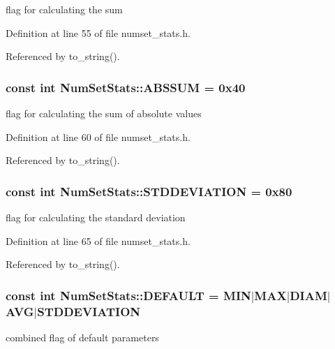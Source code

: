 flag for calculating the sum 

Definition at line 55 of file numset\_\-stats.h.

Referenced by to\_\-string().\hypertarget{class_num_set_stats_afd3e476b938988fc3ed9aef347d83f8}{
\subsubsection[ABSSUM]{\setlength{\rightskip}{0pt plus 5cm}const int {\bf NumSetStats::ABSSUM} = 0x40}}
\label{class_num_set_stats_afd3e476b938988fc3ed9aef347d83f8}


flag for calculating the sum of absolute values 

Definition at line 60 of file numset\_\-stats.h.

Referenced by to\_\-string().\hypertarget{class_num_set_stats_e7880d38dc58838bda30a0554ef7af59}{
\subsubsection[STDDEVIATION]{\setlength{\rightskip}{0pt plus 5cm}const int {\bf NumSetStats::STDDEVIATION} = 0x80}}
\label{class_num_set_stats_e7880d38dc58838bda30a0554ef7af59}


flag for calculating the standard deviation 

Definition at line 65 of file numset\_\-stats.h.

Referenced by to\_\-string().\hypertarget{class_num_set_stats_0d368de57b461369635aced38be32b25}{
\subsubsection[DEFAULT]{\setlength{\rightskip}{0pt plus 5cm}const int {\bf NumSetStats::DEFAULT} = {\bf MIN}$|${\bf MAX}$|${\bf DIAM}$|${\bf AVG}$|${\bf STDDEVIATION}}}
\label{class_num_set_stats_0d368de57b461369635aced38be32b25}


combined flag of default parameters 

